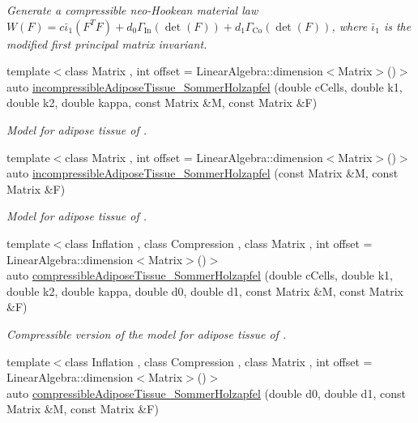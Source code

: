 \begin{DoxyCompactItemize}
\begin{DoxyCompactList}\small\item\em Generate a compressible neo-\/\-Hookean material law $ W(F)=c\bar\iota_1(F^T F)+d_0\Gamma_\mathrm{In}(\det(F))+d_1\Gamma_\mathrm{Co}(\det(F)) $, where $\bar\iota_1$ is the modified first principal matrix invariant. \end{DoxyCompactList}\item 
{\footnotesize template$<$class Matrix , int offset = Linear\-Algebra\-::dimension$<$\-Matrix$>$()$>$ }\\auto \hyperlink{group__Biomechanics_gac269eefc1abb994044e1634c20a98061}{incompressible\-Adipose\-Tissue\-\_\-\-Sommer\-Holzapfel} (double c\-Cells, double k1, double k2, double kappa, const Matrix \&M, const Matrix \&F)
\begin{DoxyCompactList}\small\item\em Model for adipose tissue of \cite{Sommer2013}. \end{DoxyCompactList}\item 
{\footnotesize template$<$class Matrix , int offset = Linear\-Algebra\-::dimension$<$\-Matrix$>$()$>$ }\\auto \hyperlink{group__Biomechanics_ga01ab128bcf179f4431b0270179af9e20}{incompressible\-Adipose\-Tissue\-\_\-\-Sommer\-Holzapfel} (const Matrix \&M, const Matrix \&F)
\begin{DoxyCompactList}\small\item\em Model for adipose tissue of \cite{Sommer2013}. \end{DoxyCompactList}\item 
{\footnotesize template$<$class Inflation , class Compression , class Matrix , int offset = Linear\-Algebra\-::dimension$<$\-Matrix$>$()$>$ }\\auto \hyperlink{group__Biomechanics_ga5c3388564c0420b62e58f48c739d27f1}{compressible\-Adipose\-Tissue\-\_\-\-Sommer\-Holzapfel} (double c\-Cells, double k1, double k2, double kappa, double d0, double d1, const Matrix \&M, const Matrix \&F)
\begin{DoxyCompactList}\small\item\em Compressible version of the model for adipose tissue of \cite{Sommer2013}. \end{DoxyCompactList}\item 
{\footnotesize template$<$class Inflation , class Compression , class Matrix , int offset = Linear\-Algebra\-::dimension$<$\-Matrix$>$()$>$ }\\auto \hyperlink{group__Biomechanics_ga27bb3f7c579ce8c21a69ea4d4d0169d7}{compressible\-Adipose\-Tissue\-\_\-\-Sommer\-Holzapfel} (double d0, double d1, const Matrix \&M, const Matrix \&F)

\end{DoxyCompactItemize}
